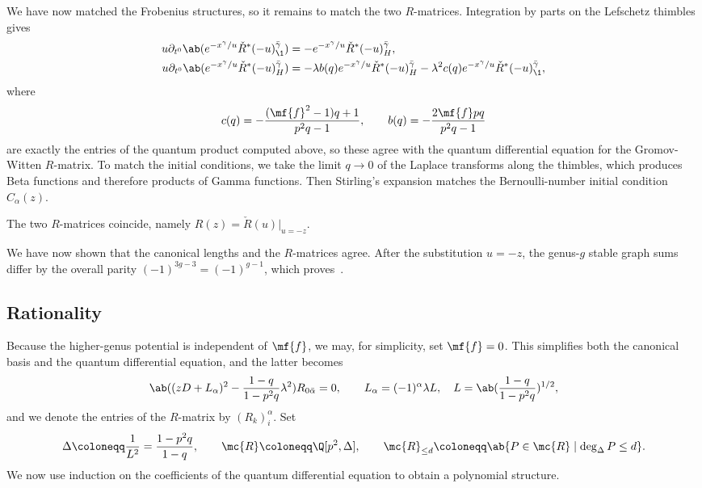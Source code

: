 We have now matched the Frobenius structures, so it remains to match the two \(R\)-matrices. Integration by parts on the Lefschetz thimbles gives
\begin{align*}
    u \partial_{t^0}\ab(e^{-x^{\gamma}/u}\check{R}^*(-u)^{\bar{\gamma}}_{\1}) &= -e^{-x^{\gamma}/u}\check{R}^*(-u)^{\bar{\gamma}}_H, \\
    u\partial_{t^0}\ab(e^{-x^{\gamma}/u}\check{R}^*(-u)^{\bar{\gamma}}_H) &= -\lambda b(q)e^{-x^{\gamma}/u}\check{R}^*(-u)^{\bar{\gamma}}_H - \lambda^2 c(q) e^{-x^{\gamma}/u}\check{R}^*(-u)^{\bar{\gamma}}_{\1},
\end{align*}
where
\[ c(q) = -\frac{(\mf{f}^2-1)q+1}{p^2q-1}, \qquad b(q) = -\frac{2\mf{f}pq}{p^2q-1} \]
are exactly the entries of the quantum product computed above, so these agree with the quantum differential equation for the Gromov-Witten \(R\)-matrix. To match the initial conditions, we take the limit \(q \to 0\) of the Laplace transforms along the thimbles, which produces Beta functions and therefore products of Gamma functions. Then Stirling's expansion matches the Bernoulli-number initial condition \(C_{\alpha}(z)\).

\begin{prop}%
\label{prop:R matrices coincide}
    The two \(R\)-matrices coincide, namely \(R(z) = \check{R}(u)|_{u=-z}\).
\end{prop}

We have now shown that the canonical lengths and the \(R\)-matrices agree. After the substitution \(u = -z\), the genus-\(g\) stable graph sums differ by the overall parity \((-1)^{3g-3} = (-1)^{g-1}\), which proves~.

\subsection{Rationality}%
\label{sub:Rationality}

Because the higher-genus potential is independent of \(\mf{f}\), we may, for simplicity, set \(\mf{f} = 0\). This simplifies both the canonical basis and the quantum differential equation, and the latter becomes
\[ \ab((zD+L_{\alpha})^2 - \frac{1-q}{1-p^2q}\lambda^2)R_{0\bar{\alpha}} = 0, \qquad L_{\alpha} = (-1)^{\alpha}\lambda L, \quad L = \ab(\frac{1-q}{1-p^2q})^{1/2}, \]
and we denote the entries of the \(R\)-matrix by \((R_k)_i^{\alpha}\). Set
\[ \Delta \coloneqq \frac{1}{L^2} = \frac{1-p^2q}{1-q}, \qquad \mc{R} \coloneqq \Q[p^2,\Delta], \qquad \mc{R}_{\leq d} \coloneqq \ab\{P \in \mc{R} \mid \deg_{\Delta} P \leq d\}. \]
We now use induction on the coefficients of the quantum differential equation to obtain a polynomial structure.

